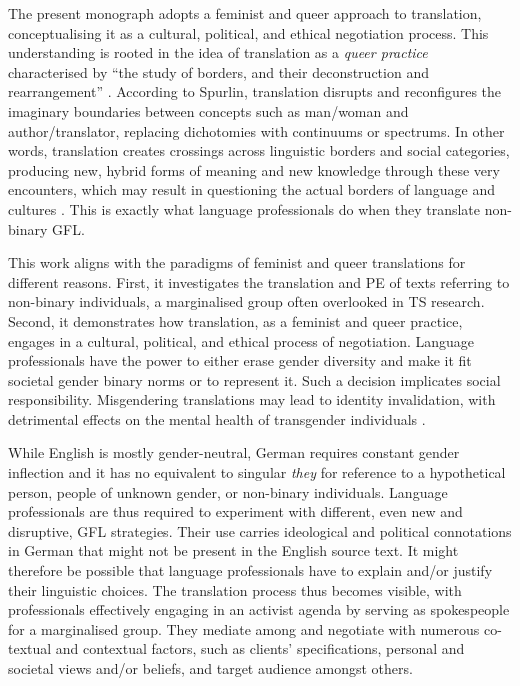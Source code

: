 The present monograph adopts a feminist and queer approach to translation, conceptualising it as a cultural, political, and ethical negotiation process. This understanding is rooted in the idea of translation as a \textit{queer practice} characterised by ``the study of borders, and their deconstruction and rearrangement'' \citep[172]{spurlin2017queering}. According to Spurlin, translation disrupts and reconfigures the imaginary boundaries between concepts such as man/woman and author/translator, replacing dichotomies with continuums or spectrums. In other words, translation creates crossings across linguistic borders and social categories, producing new, hybrid forms of meaning and new knowledge through these very encounters, which may result in questioning the actual borders of language and cultures \citep[173]{spurlin2017queering}. This is exactly what language professionals do when they translate non-binary GFL.

This work aligns with the paradigms of feminist and queer translations for different reasons. First, it investigates the translation and PE of texts referring to non-binary individuals, a marginalised group often overlooked in TS research. Second, it demonstrates how translation, as a feminist and queer practice, engages in a cultural, political, and ethical process of negotiation. Language professionals have the power to either erase gender diversity and make it fit societal gender binary norms or to represent it. Such a decision implicates social responsibility. Misgendering translations may lead to identity invalidation, with detrimental effects on the mental health of transgender individuals \citep{mclemore2015experiences,mclemore2018minority}. 

While English is mostly gender-neutral, German requires constant gender inflection and it has no equivalent to singular \textit{they} for reference to a hypothetical person, people of unknown gender, or non-binary individuals. Language professionals are thus required to experiment with different, even new and disruptive, GFL strategies. Their use carries ideological and political connotations in German that might not be present in the English source text. It might therefore be possible that language professionals have to explain and/or justify their linguistic choices. The translation process thus becomes visible, with professionals effectively engaging in an activist agenda by serving as spokespeople for a marginalised group. They mediate among and negotiate with numerous co-textual and contextual factors, such as clients’ specifications, personal and societal views and/or beliefs, and target audience amongst others.

